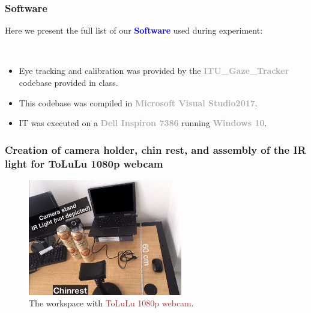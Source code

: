 \documentclass{beamer}
\begin{document}
    \begin{frame}
        \frametitle{Software}
        \center
        Here we present the full list of our \textbf{\textcolor{blue}{Software}}
        used during experiment:

        ~\

        \begin{itemize}
            \item Eye tracking and calibration was provided by the
            \textbf{\textcolor{darkgray}{ITU\_Gaze\_Tracker}} codebase provided in
            class.

            \item This codebase was compiled in
            \textbf{\textcolor{darkgray}{Microsoft Visual Studio2017}}.

            \item IT was executed on a \textbf{\textcolor{darkgray}{Dell Inspiron 7386}}
            running \textbf{\textcolor{darkgray}{Windows 10}}.
        \end{itemize}

    \end{frame}

    \begin{frame}
        \frametitle{Creation of camera holder, chin rest, and assembly of the
        IR light for ToLuLu 1080p webcam}

        \begin{figure}
            \begin{center}
                \includegraphics[width=0.6\textwidth]{Work_space_Tolulu.jpg}
            \end{center}
            \caption{The workspace with \textcolor{brown}{ToLuLu 1080p webcam}.}
            \label{fig:Workspace_Tolulu}
        \end{figure}

    \end{frame}
\end{document}
